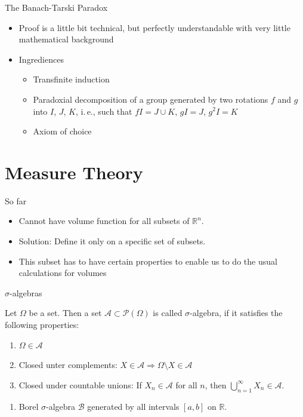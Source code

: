 \documentclass{beamer}
\newcommand{\RR}{\mathbb{R}}
\begin{document}
\begin{frame}{The Banach-Tarski Paradox}
  \begin{itemize}
  \item Proof is a little bit technical, but perfectly understandable
     with very little mathematical background
  \item Ingrediences
    \begin{itemize}
    \item Transfinite induction
    \item Paradoxial decomposition of a group generated by two rotations $f$ and $g$ into $I$, $J$, $K$, i.\,e., such that $fI = J \cup K$, $gI = J$, $g^2I = K$
    \item Axiom of choice
    \end{itemize}
  \end{itemize}
\end{frame}

\section{Measure Theory}

\begin{frame}{So far}
  \begin{itemize}
  \item Cannot have volume function for all subsets of $\RR^n$.
  \item Solution: Define it only on a specific set of subsets.
  \item This subset has to have certain properties to enable us
    to do the usual calculations for volumes
  \end{itemize}
\end{frame}

\begin{frame}{$\sigma$-algebras}
  \begin{definition}
    Let $\Omega$ be a set. Then a set $\mathcal{A} \subset \mathcal{P}(\Omega)$
    is called $\sigma$-algebra, if it satisfies the following properties:
    \begin{enumerate}
    \item $\Omega \in \mathcal{A}$
    \item Closed unter complements: $X \in \mathcal{A} \Rightarrow
      \Omega\setminus X \in \mathcal{A}$
    \item Closed under countable unions: If $X_n \in \mathcal{A}$ for all $n$,
      then $\bigcup_{n=1}^\infty X_n \in \mathcal{A}$.
    \end{enumerate}
  \end{definition}

  \begin{example}
    \begin{enumerate}
    \item Borel $\sigma$-algebra $\mathcal{B}$ generated by all intervals
      $[a,b]$ on $\RR$.
    \end{enumerate}
  \end{example}
\end{frame}
\end{document}
